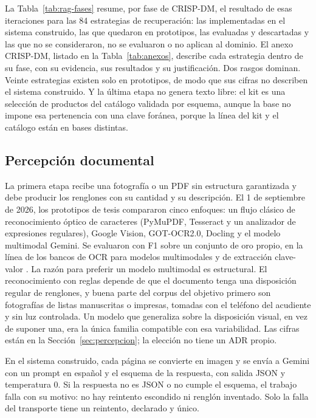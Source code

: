 La Tabla~\ref{tab:rag-fases} resume, por fase de CRISP-DM, el resultado de esas iteraciones para
las 84 estrategias de recuperación: las implementadas en el sistema construido, las que quedaron en
prototipos, las evaluadas y descartadas y las que no se consideraron, no se evaluaron o no aplican
al dominio. El anexo CRISP-DM, listado en la Tabla~\ref{tab:anexos}, describe cada estrategia
dentro de su fase, con su evidencia, sus resultados y su justificación. Dos rasgos dominan.
Veinte estrategias existen solo en prototipos, de modo que sus cifras no describen el sistema
construido. Y la última etapa no genera texto libre: el kit es una selección de productos del
catálogo validada por esquema, aunque la base no impone esa pertenencia con una clave foránea,
porque la línea del kit y el catálogo están en bases distintas.


\subsection{Percepción documental}
\label{sec:percepcion-dev}

La primera etapa recibe una fotografía o un PDF sin estructura garantizada y debe producir los
renglones con su cantidad y su descripción. El 1 de septiembre de 2026, los prototipos de tesis
compararon cinco enfoques: un flujo clásico de reconocimiento óptico de caracteres (PyMuPDF,
Tesseract y un analizador de expresiones regulares), Google Vision, GOT-OCR2.0, Docling y el modelo
multimodal Gemini. Se evaluaron con F1 sobre un conjunto de oro propio, en la línea de los bancos de
OCR para modelos multimodales \citep{liu_ocrbench_2024} y de extracción clave-valor
\citep{shen_ocr_2026}. La razón para preferir un modelo multimodal es estructural. El
reconocimiento con reglas depende de que el documento tenga una disposición regular de renglones, y
buena parte del corpus del objetivo primero son fotografías de listas manuscritas o impresas,
tomadas con el teléfono del acudiente y sin luz controlada. Un modelo que generaliza sobre la
disposición visual, en vez de suponer una, era la única familia compatible con esa variabilidad.
Las cifras están en la Sección~\ref{sec:percepcion}; la elección no tiene un ADR propio.

En el sistema construido, cada página se convierte en imagen y se envía a Gemini con un prompt en
español y el esquema de la respuesta, con salida JSON y temperatura 0. Si la respuesta no es JSON o
no cumple el esquema, el trabajo falla con su motivo: no hay reintento escondido ni renglón
inventado. Solo la falla del transporte tiene un reintento, declarado y único.

